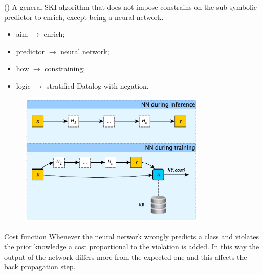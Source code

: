 \documentclass[presentation]{beamer}\mode<presentation>{\usetheme{AMSBolognaFC}}
\begin{document}
\begin{frame}[allowframebreaks]{\longkill}
    \begin{block}{\longkill{} (\shortkill)}
        A general SKI algorithm that does not impose constrains on the sub-symbolic predictor to enrich, except being a neural network.
        \begin{itemize}
            \item aim $\rightarrow$ enrich;
            \item predictor $\rightarrow$ neural network;
            \item how $\rightarrow$ constraining;
            \item logic $\rightarrow$ stratified Datalog with negation.
        \end{itemize}
    \end{block}
    
    \framebreak
    
    \begin{figure}
        \centering
        \includegraphics[width=0.8\textwidth]{figures/lambda-layer.pdf}
    \end{figure}
    
    \framebreak
    
    
    
    \framebreak
    
    \begin{block}{Cost function}
        Whenever the neural network wrongly predicts a class and violates the prior knowledge a cost proportional to the violation is added.
        In this way the output of the network differs more from the expected one and this affects the back propagation step.
    \end{block}
    

\end{frame}
\end{document}
